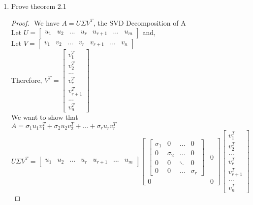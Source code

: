 \documentclass[12pt]{article}
\begin{document}
\begin{enumerate}[label=(\alph*)]
\item Prove theorem 2.1
\begin{proof} $ $\newline
We have $A = U\Sigma V^T$, the SVD Decomposition of A \\
Let  $U = \begin{bmatrix} u_1 & u_2 & ... & u_r & u_{r+1} & ... & u_m\end{bmatrix}$ and, \\

Let $V = \begin{bmatrix} v_1 & v_2 & ... & v_r & v_{r+1} & ... & v_n\end{bmatrix}$ \\

Therefore, $V^T = \begin{bmatrix} v_1^T \\ v_2^T \\ ... \\ v_r^T \\ v_{r+1}^T \\ ... \\ v_n^T\end{bmatrix} $ \\ 

We want to show that \\
$A = \sigma_{1}u_{1}v_{1}^T + \sigma_{2}u_{2}v_{2}^T + ... + \sigma_{r}u_{r}v_{r}^T$\\

$$ U\Sigma V^T = \begin{bmatrix} u_1 & u_2 & ... & u_r & u_{r+1} & ... & u_m\end{bmatrix} \begin{bmatrix}
    \begin{bmatrix}
        \sigma_1 & 0 & ... & 0 \\
        0 & \sigma_2 & ... & 0 \\
        0 & 0 & \ddots & 0 \\
        0 & 0 & ... & \sigma_r
    \end{bmatrix} & 0 \\
    0 & 0
\end{bmatrix} \begin{bmatrix} v_1^T \\ v_2^T \\ ... \\ v_r^T \\ v_{r+1}^T \\ ... \\ v_n^T\end{bmatrix}$$


\end{proof}
\end{enumerate}
\end{document}
